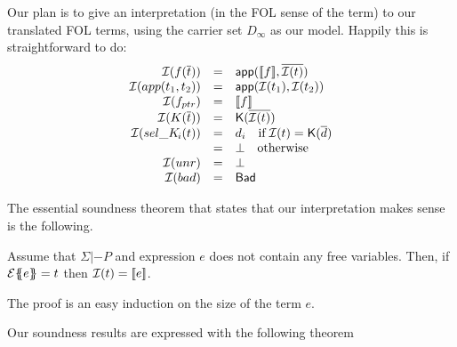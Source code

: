 Our plan is to give an interpretation (in the FOL sense of the term) to our 
translated FOL terms, using the carrier set $D_\infty$ as our model. 
Happily this is straightforward to do:
\[\begin{array}{rcl}
   {\cal I}(f(\overline{t})) & = & \mathsf{app}([\![f]\!],\overline{{\cal I}(t)}) \\
   {\cal I}(app(t_1,t_2))     & = & \mathsf{app}({\cal I}(t_1), {\cal I}(t_2)) \\
   {\cal I}(f_{ptr})  & = & [\![f]\!] \\
   {\cal I}(K(\overline{t})) & = & \mathsf{K}(\overline{{\cal I}(t)}) \\
   {\cal I}(\mathop{sel\_K\!_{i}}(t)) & = &  d_i \quad \mbox{if}\; {\cal I}(t) = \mathsf{K}(\overline{d}) \\
                           & = & \bot \quad \mbox{otherwise} \\
  {\cal I}(unr)       & = & \bot \\
  {\cal I}(bad)       & = & \mathsf{Bad}
\end{array}\]

The essential soundness theorem that states that our interpretation makes sense is
the following.
\begin{theorem}\label{thm:interp-respect}
Assume that $\Sigma |- P$ and expression $e$ does not contain any free variables.
Then, if ${\cal E}\{\!\!\{e\}\!\!\} = t$ then ${\cal I}(t) = [\![e]\!]$.
\end{theorem}
The proof is an easy induction on the size of the term $e$.

Our soundness results are expressed with the following theorem

